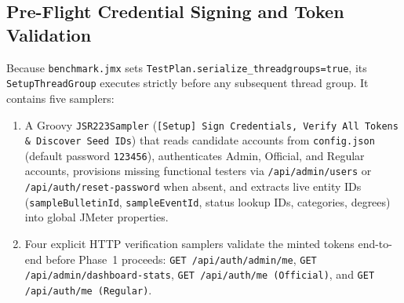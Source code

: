 \documentclass[11pt,letterpaper]{article}
\begin{document}
\subsection{Pre-Flight Credential Signing and Token Validation}
Because \texttt{benchmark.jmx} sets \texttt{TestPlan.serialize\_threadgroups=true}, its \texttt{SetupThreadGroup} executes strictly before any subsequent thread group. It contains five samplers:
\begin{enumerate}
  \item A Groovy \texttt{JSR223Sampler} (\texttt{[Setup] Sign Credentials, Verify All Tokens \& Discover Seed IDs}) that reads candidate accounts from \texttt{config.json} (default password \texttt{123456}), authenticates Admin, Official, and Regular accounts, provisions missing functional testers via \texttt{/api/admin/users} or \texttt{/api/auth/reset-password} when absent, and extracts live entity IDs (\texttt{sampleBulletinId}, \texttt{sampleEventId}, status lookup IDs, categories, degrees) into global JMeter properties.
  \item Four explicit HTTP verification samplers validate the minted tokens end-to-end before Phase~1 proceeds: \texttt{GET /\allowbreak api/\allowbreak auth/\allowbreak admin/\allowbreak me}, \texttt{GET /\allowbreak api/\allowbreak admin/\allowbreak dashboard-stats}, \texttt{GET /\allowbreak api/\allowbreak auth/\allowbreak me (Official)}, and \texttt{GET /\allowbreak api/\allowbreak auth/\allowbreak me (Regular)}.
\end{enumerate}
\end{document}
